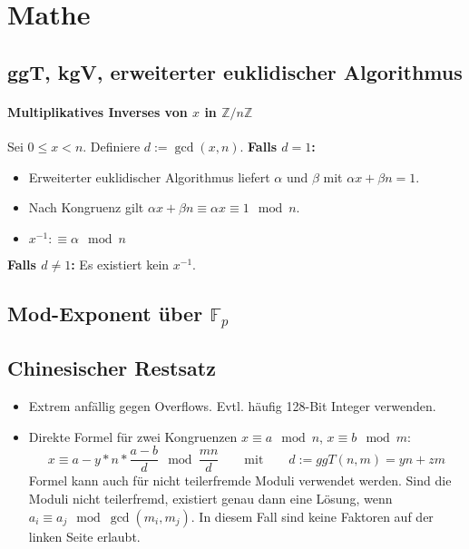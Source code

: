 \section{Mathe}

\subsection{ggT, kgV, erweiterter euklidischer Algorithmus}



\paragraph{Multiplikatives Inverses von $x$ in $\mathbb{Z}/n\mathbb{Z}$}
Sei $0 \leq x < n$. Definiere $d := \gcd(x, n)$.\newline
\textbf{Falls $d = 1$:}
\begin{itemize}[nosep]
	\item Erweiterter euklidischer Algorithmus liefert $\alpha$ und $\beta$ mit
	$\alpha x + \beta n = 1$.
	\item Nach Kongruenz gilt $\alpha x + \beta n \equiv \alpha x \equiv 1 \mod n$.
	\item $x^{-1} :\equiv \alpha \mod n$
	\end{itemize}
\textbf{Falls $d \neq 1$:} Es existiert kein $x^{-1}$.


\subsection{Mod-Exponent über $\mathbb{F}_p$}


\subsection{Chinesischer Restsatz}
\begin{itemize}
	\item Extrem anfällig gegen Overflows. Evtl. häufig 128-Bit Integer verwenden.
	\item Direkte Formel für zwei Kongruenzen $x \equiv a \mod n$, $x \equiv b \mod m$:
	\[
		x \equiv a - y * n * \frac{a - b}{d} \mod \frac{mn}{d}
		\qquad \text{mit} \qquad
		d := ggT(n, m) = yn + zm
	\]
	Formel kann auch für nicht teilerfremde Moduli verwendet werden.
	Sind die Moduli nicht teilerfremd, existiert genau dann eine Lösung,
	wenn $a_i \equiv a_j \mod \gcd(m_i, m_j)$.
	In diesem Fall sind keine Faktoren
	auf der linken Seite erlaubt.
\end{itemize}


